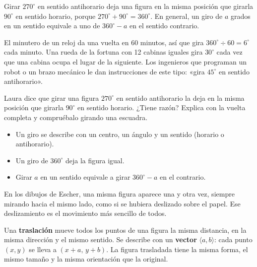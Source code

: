 \documentclass[11pt]{article}
\begin{document}
\begin{ejemplo}
Girar $270^\circ$ en sentido antihorario deja una figura en la misma posición que girarla
$90^\circ$ en sentido horario, porque $270^\circ + 90^\circ = 360^\circ$. En general, un giro de
$a$ grados en un sentido equivale a uno de $360^\circ - a$ en el sentido contrario.
\end{ejemplo}

\begin{aplicacion}
El minutero de un reloj da una vuelta en 60 minutos, así que gira $360^\circ \div 60 = 6^\circ$
cada minuto. Una rueda de la fortuna con 12 cabinas iguales gira $30^\circ$ cada vez que una
cabina ocupa el lugar de la siguiente. Los ingenieros que programan un robot o un brazo mecánico
le dan instrucciones de este tipo: «gira $45^\circ$ en sentido antihorario».
\end{aplicacion}

\begin{preguntas}
\pregunta Laura dice que girar una figura $270^\circ$ en sentido antihorario la deja en la misma
posición que girarla $90^\circ$ en sentido horario. ¿Tiene razón? Explica con la vuelta completa
y compruébalo girando una escuadra.
\end{preguntas}

\begin{resumen}
\begin{itemize}
  \item Un giro se describe con un centro, un ángulo y un sentido (horario o antihorario).
  \item Un giro de $360^\circ$ deja la figura igual.
  \item Girar $a$ en un sentido equivale a girar $360^\circ - a$ en el contrario.
\end{itemize}
\end{resumen}

\label{tema:traslaciones}

\begin{hilo}
En los dibujos de Escher, una misma figura aparece una y otra vez, siempre mirando hacia el
mismo lado, como si se hubiera deslizado sobre el papel. Ese deslizamiento es el movimiento más
sencillo de todos.
\end{hilo}

\begin{definicion}[Traslación]
Una \textbf{traslación} mueve todos los puntos de una figura la misma distancia, en la misma
dirección y el mismo sentido. Se describe con un \textbf{vector} $\langle a, b\rangle$: cada punto
$(x, y)$ se lleva a $(x + a,\, y + b)$. La figura trasladada tiene la misma forma, el mismo
tamaño y la misma orientación que la original.
\end{definicion}
\end{document}
